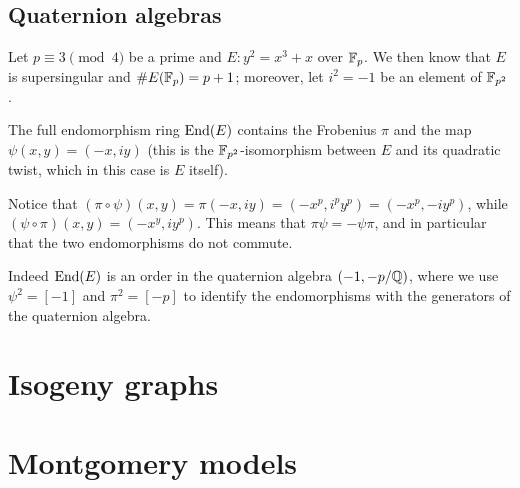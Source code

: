 \subsection{Quaternion algebras}

\begin{example}
    Let $p\equiv3\pmod4$ be a prime and $E:y^2=x^3+x$ over $\mathbb{F}_p$. We then know that $E$ is supersingular and $\# E(\mathbb{F}_p)=p+1$; moreover, let $i^2=-1$ be an element of $\mathbb{F}_{p^2}$.
    
    The full endomorphism ring $\operatorname{End}(E)$ contains the Frobenius $\pi$ and the map $\psi(x,y)=(-x,iy)$ (this is the $\mathbb{F}_{p^2}$-isomorphism between $E$ and its quadratic twist, which in this case is $E$ itself).
    
    Notice that $(\pi\circ\psi)(x,y)=\pi(-x,iy)=(-x^p,i^py^p)=(-x^p,-iy^p)$, while $(\psi\circ\pi)(x,y)=(-x^y,iy^p)$. This means that $\pi\psi=-\psi\pi$, and in particular that the two endomorphisms do not commute.
    
    Indeed $\operatorname{End}(E)$ is an order in the quaternion algebra $(-1,-p/\mathbb{Q})$, where we use $\psi^2=[-1]$ and $\pi^2=[-p]$ to identify the endomorphisms with the generators of the quaternion algebra.
\end{example}

\section{Isogeny graphs}

\section{Montgomery models}

